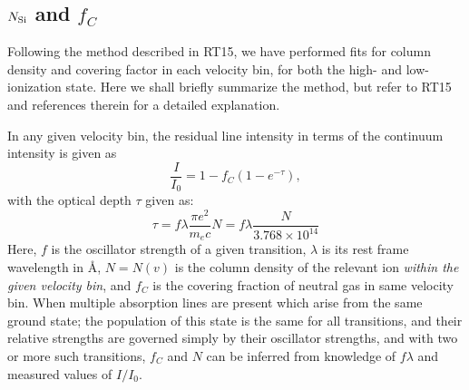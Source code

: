 \documentclass[twocolumn]{aastex61}
\begin{document}


\subsection{$N_{\rm Si}$ and $f_C$}\label{sec:aod}

Following the method described in RT15, we have performed fits for
column density and covering factor in each velocity bin, for both the
high- and low-ionization state. Here we shall briefly summarize the
method, but refer to RT15 and references therein for a detailed
explanation.

In any given velocity bin, the residual line intensity in terms of the
continuum intensity is given as
%
\begin{equation}
\label{eq:II0}
\frac{I}{I_0} = 1 - f_C (1 - e^{-\tau}),
\end{equation}
%
 with the optical depth $\tau$ given as:
%
\begin{equation}
\label{eq:tau}
\tau = f\lambda \frac{\pi e^2}{m_e c} N 
       = f\lambda \frac{N}{3.768 \times 10^{14}}
\end{equation}
%
 Here, $f$ is the oscillator strength of a given transition, $\lambda$
is its rest frame wavelength in Å, $N = N(v)$ is the column density of
the relevant ion \emph{within the given velocity bin}, and $f_{C}$ is
the covering fraction of neutral gas in same velocity bin. When multiple
absorption lines are present which arise from the same ground state; the
population of this state is the same for all transitions, and their
relative strengths are governed simply by their oscillator strengths,
and with two or more such transitions, $f_{C}$ and $N$ can be inferred
from knowledge of $f \lambda$ and measured values of $I/I_0$.
\end{document}
